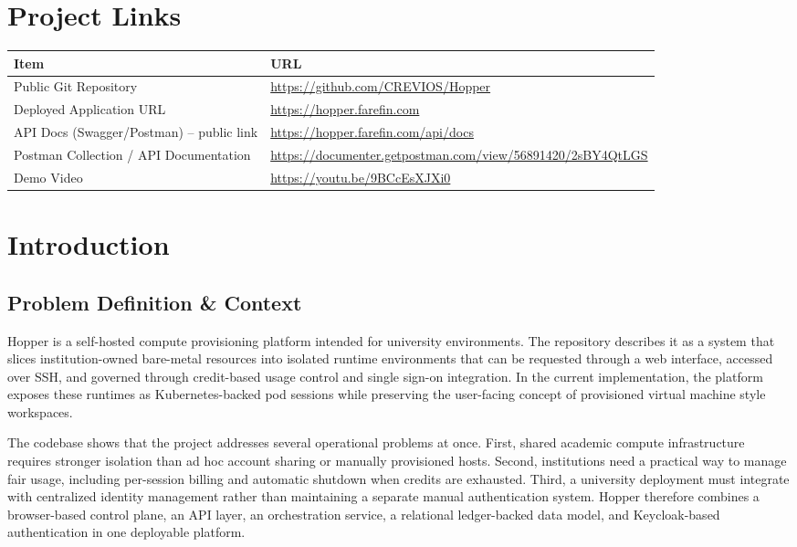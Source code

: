 \documentclass[12pt,a4paper]{article}
\begin{document}
\clearpage
{}
\tableofcontents
\newpage

{}
\section*{Project Links}

\begin{tabularx}{\textwidth}{|>{\RaggedRight\arraybackslash}p{}|>{\RaggedRight\arraybackslash}X|}
    \hline
    \textbf{Item} & \textbf{URL} \\
    \hline
    Public Git Repository & \url{https://github.com/CREVIOS/Hopper} \\
    \hline
    Deployed Application URL & \url{https://hopper.farefin.com} \\
    \hline
    API Docs (Swagger/Postman) -- public link & \url{https://hopper.farefin.com/api/docs} \\
    \hline
    Postman Collection / API Documentation & \url{https://documenter.getpostman.com/view/56891420/2sBY4QtLGS} \\
    \hline
    Demo Video & \url{https://youtu.be/9BCcEsXJXi0} \\
    \hline
\end{tabularx}

\newpage

\section{Introduction}
\subsection{Problem Definition \& Context}
Hopper is a self-hosted compute provisioning platform intended for university environments. The repository describes it as a system that slices institution-owned bare-metal resources into isolated runtime environments that can be requested through a web interface, accessed over SSH, and governed through credit-based usage control and single sign-on integration. In the current implementation, the platform exposes these runtimes as Kubernetes-backed pod sessions while preserving the user-facing concept of provisioned virtual machine style workspaces.

The codebase shows that the project addresses several operational problems at once. First, shared academic compute infrastructure requires stronger isolation than ad hoc account sharing or manually provisioned hosts. Second, institutions need a practical way to manage fair usage, including per-session billing and automatic shutdown when credits are exhausted. Third, a university deployment must integrate with centralized identity management rather than maintaining a separate manual authentication system. Hopper therefore combines a browser-based control plane, an API layer, an orchestration service, a relational ledger-backed data model, and Keycloak-based authentication in one deployable platform.
\end{document}
